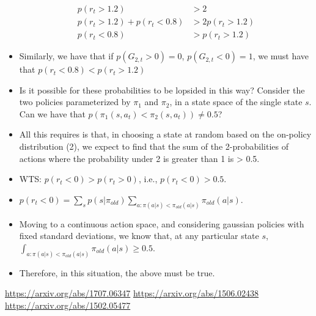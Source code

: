 \documentclass[a4paper]{article}
\begin{document}
\begin{itemize}
\begin{align*}
                {p(r_t > 1.2)}
            &> 2\\
            p(r_t > 1.2) + p(r_t < 0.8)
            &> 2p(r_t > 1.2)\\
            p(r_t < 0.8)
            &> p(r_t > 1.2)
        \end{align*}
    \item Similarly, we have that if $p(G_{2, t} > 0) = 0$, 
        $p(G_{2, t} < 0) = 1$, we must have that $p(r_t < 0.8) < p(r_t > 1.2)$
    \item Is it possible for these probabilities to be lopsided in this way?
        Consider the two policies parameterized by $\pi_1$ and
        $\pi_2$, in a state space of the single state $s$. Can we have that 
        $p(\pi_1(s, a_t) < \pi_2(s, a_t)) \ne 0.5$?
    \item All this requires is that, in choosing a state at random based on the
        on-policy distribution (2), we expect to find that the sum of the
        2-probabilities of actions where the probability under 2 is greater
        than 1 is > 0.5.
    \item WTS: $p(r_t < 0) > p(r_t > 0)$, i.e., $p(r_t < 0) > 0.5$.
    \item $p(r_t < 0) = \sum_{s}p(s | \pi_{old})
        \sum_{a: \pi(a | s) < \pi_{old}(a | s)}\pi_{old}(a | s)$.
    \item Moving to a continuous action space, and considering gaussian
        policies with fixed standard deviations, we know that, at any
        particular state $s$, $\int_{a: \pi(a | s) < \pi_{old}(a |
        s)}\pi_{old}(a | s) \ge 0.5$.
    \item Therefore, in this situation, the above must be true.
    \end{itemize}

%

\newpage
\begin{thebibliography}{9}
\url{https://arxiv.org/abs/1707.06347}
\url{https://arxiv.org/abs/1506.02438}
\url{https://arxiv.org/abs/1502.05477}
\end{thebibliography}
\end{document}
